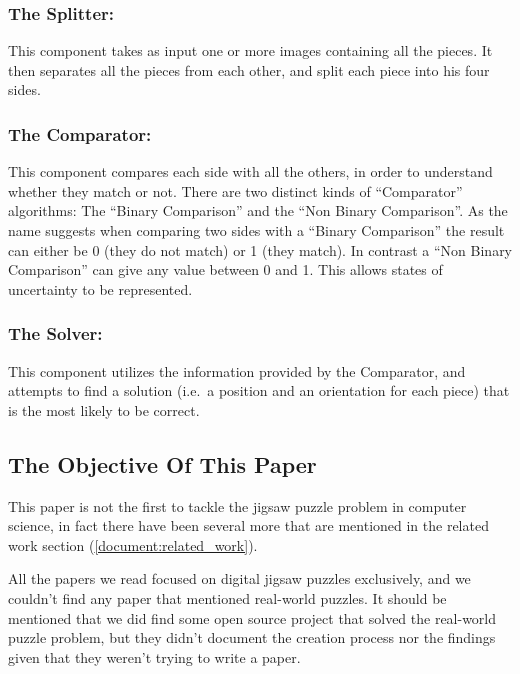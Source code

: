 \documentclass{article}
\newenvironment{indented_section}
  {\adjustwidth{3em}{0pt}}
  {\endadjustwidth}
\begin{document}
\begin{indented_section}

    \subsubsection{The Splitter:} This component takes as input one or more images
    containing all the pieces. It then separates all the pieces from each other,
    and split each piece into his four sides.\label{document:splitter}

    \subsubsection{The Comparator:} This component compares each side with all the
    others, in order to understand whether they match or not.\newline
    There are two distinct kinds of “Comparator” algorithms:
    The “Binary Comparison” and the “Non Binary Comparison”.
    As the name suggests when comparing two sides with a “Binary Comparison”
    the result can either be 0 (they do not match) or 1 (they match).
    In contrast a “Non Binary Comparison” can give any value between 0 and 1.
    This allows states of uncertainty to be represented.\label{document:comparator}

    \subsubsection{The Solver:} This component utilizes the information provided by the
    Comparator, and attempts to find a solution
    (i.e.\ a position and an orientation for each piece)
    that is the most likely to be correct.\label{document:solver}

\end{indented_section}


\subsection{The Objective Of This Paper}\label{document:objective}

This paper is not the first to tackle the jigsaw puzzle problem in computer science,
in fact there have been several more that are mentioned in the related work section (\cref{document:related_work}).

All the papers we read focused on digital jigsaw puzzles exclusively,
and we couldn't find any paper that mentioned real-world puzzles.
It should be mentioned that we did find some open source project that solved the
real-world puzzle problem, but they didn’t document the creation process nor the
findings given that they weren't trying to write a paper.
\end{document}
